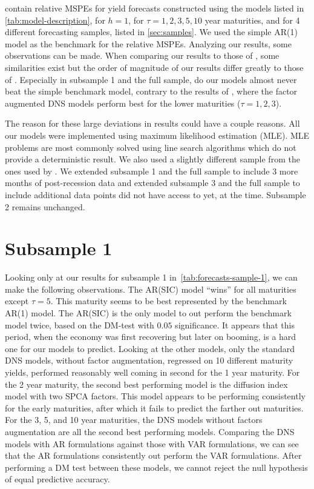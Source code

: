  contain relative MSPEs for yield forecasts constructed using the models listed in \cref{tab:model-description}, for $h = 1$, for $\tau = 1, 2, 3, 5, 10$ year maturities, and for 4 different forecasting samples, listed in \cref{sec:samples}. 
We used the simple AR(1) model as the benchmark for the relative MSPEs. 
Analyzing our results, some observations can be made. 
When comparing our results to those of \textcite{swanson_big_2017}, some similarities exist but the order of magnitude of our results differ greatly to those of \citeauthor{swanson_big_2017}. 
Especially in subsample 1 and the full sample, do our models almost never beat the simple benchmark model, contrary to the results of \citeauthor{swanson_big_2017}, where the factor augmented DNS models perform best for the lower maturities ($\tau = 1, 2, 3$).

The reason for these large deviations in results could have a couple reasons. All our models were implemented using maximum likelihood estimation (MLE). 
MLE problems are most commonly solved using line search algorithms which do not provide a deterministic result. 
We also used a slightly different sample from the ones used by \citeauthor{swanson_big_2017}. 
We extended subsample 1 and the full sample to include 3 more months of post-recession data and extended subsample 3 and the full sample to include additional data points \citeauthor{swanson_big_2017} did not have access to yet, at the time. 
Subsample 2 remains unchanged.

\section{Subsample 1}
Looking only at our results for subsample 1 in~\cref{tab:forecasts-sample-1}, we can make the following observations. 
The AR(SIC) model \enquote{wins} for all maturities except $\tau = 5$. 
This maturity seems to be best represented by the benchmark AR(1) model.
The AR(SIC) is the only model to out perform the benchmark model twice, based on the DM-test with $0.05$ significance. 
It appears that this period, when the economy was first recovering but later on booming, is a hard one for our models to predict. 
Looking at the other models, only the standard DNS models, without factor augmentation, regressed on 10 different maturity yields, performed reasonably well coming in second for the 1 year maturity. 
For the 2 year maturity, the second best performing model is the diffusion index model with two SPCA factors. 
This model appears to be performing consistently for the early maturities, after which it fails to predict the farther out maturities. 
For the 3, 5, and 10 year maturities, the DNS models without factors augmentation are all the second best performing models. 
Comparing the DNS models with AR formulations against those with VAR formulations, we can see that the AR formulations consistently out perform the VAR formulations. 
After performing a DM test between these models, we cannot reject the null hypothesis of equal predictive accuracy. 

